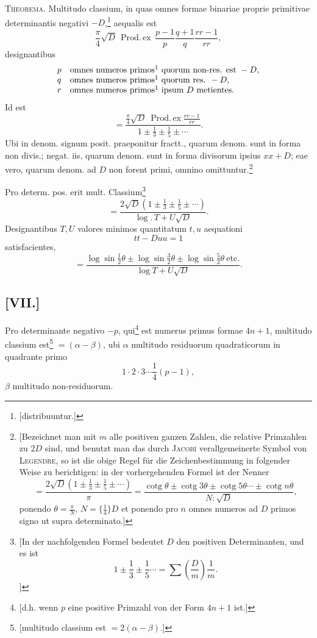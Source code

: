 \documentclass[12pt]{article}
\begin{document}
\textsc{Theorema.} Multitudo classium, in quas omnes formae binariae proprie primitivae determinantis negativi $-D$,\footnote{[distribuuntur.]} aequalis est
\[
\frac{\pi}{4}\sqrt D\,
\mathop{\mathrm{Prod.\,ex}}\,
\frac{p-1}{p}\frac{q+1}{q}\frac{rr-1}{rr},
\]
designantibus
\[
\begin{array}{ll}
p&\text{omnes numeros primos\footnotemark{} quorum non-res. est }-D,\\
q&\text{omnes numeros primos\footnotemark[\value{footnote}]{} quorum res. }-D,\\
r&\text{omnes numeros primos\footnotemark[\value{footnote}]{} ipsum }D\text{ metientes.}
\end{array}
\]
\footnotetext{[impares.]}
Id est
\[
=
\frac{\frac{\pi}{4}\sqrt D\ \mathop{\mathrm{Prod.\,ex}}\frac{rr-1}{rr}}
{1\pm\frac13\pm\frac15\pm\cdots}.
\]
Ubi in denom. signum posit. praeponitur fractt., quarum denom. sunt in forma non divis.; negat. iis, quarum denom. sunt in forma divisorum ipsius $xx+D$; eae vero, quarum denom. ad $D$ non forent primi, omnino omittuntur.\footnote{[Bezeichnet man mit $m$ alle positiven ganzen Zahlen, die relative Primzahlen zu $2D$ sind, und benutzt man das durch \textsc{Jacobi} verallgemeinerte Symbol von \textsc{Legendre}, so ist die obige Regel für die Zeichenbestimmung in folgender Weise zu berichtigen: in der vorhergehenden Formel ist der Nenner
\[
=\frac{2\sqrt D\left(1\pm\frac13\pm\frac15\pm\cdots\right)}{\pi}
=
\frac{\operatorname{cotg}\theta\pm\operatorname{cotg}3\theta\pm\operatorname{cotg}5\theta\cdots\pm\operatorname{cotg}n\theta}{N:\sqrt D},
\]
ponendo $\theta=\frac{\pi}{N}$, $N=\{\frac14\}D$ et ponendo pro $n$ omnes numeros ad $D$ primos signo ut supra determinato.]}

Pro determ. pos. erit mult. Classium\footnote{[In der nachfolgenden Formel bedeutet $D$ den positiven Determinanten, und es ist
\[
1\pm\frac13\pm\frac15\cdots=\sum\left(\frac{D}{m}\right)\frac1m .
\]]}
\[
=
\frac{2\sqrt D\left(1\pm\frac13\pm\frac15\pm\cdots\right)}
{\log.\,T+U\sqrt D}.
\]
Designantibus $T,U$ valores minimos quantitatum $t,u$ aequationi
\[
tt-Duu=1
\]
satisfacientes,
\[
=
\frac{\log\sin\frac12\theta\pm\log\sin\frac32\theta\pm\log\sin\frac52\theta\ \mathrm{etc.}}
{\log T+U\sqrt D}.
\]

\subsection*{[VII.]}

Pro determinante negativo $-p$, qui\footnote{[d.h. wenn $p$ eine positive Primzahl von der Form $4n+1$ ist.]} est numerus primus formae $4n+1$, multitudo classium est\footnote{[multitudo classium est $=2(\alpha-\beta)$.]} $=(\alpha-\beta)$, ubi $\alpha$ multitudo residuorum quadraticorum in quadrante primo
\[
1\cdot2\cdot3\cdots\frac14(p-1),
\]
$\beta$ multitudo non-residuorum.
\end{document}
